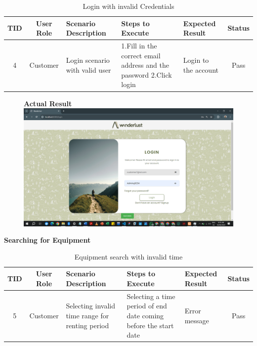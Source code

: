\begin{table}[ht]
\centering
\begin{tabularx}{\textwidth}{|c|c|X|X|X|c|}
\hline
\textbf{TID} & \textbf{User Role} & \textbf{Scenario Description} & \textbf{Steps to Execute} & \textbf{Expected Result} & \textbf{Status} \\ \hline
4 & Customer & Login scenario with valid user & 1.Fill in the correct email address and the password \newline 2.Click login & Login to the account & Pass \\ \hline
\end{tabularx}
\caption{Login with invalid Credentials}
\end{table}

\begin{figure}[h!]
    \centering
    \textbf{Actual Result}
    \includegraphics[width=1\textwidth]{Images/Test Cases/3. valid login.png}
\end{figure}
\clearpage



\textbf{Searching for Equipment}\\
\begin{table}[ht]
\centering
\begin{tabularx}{\textwidth}{|c|c|X|X|X|c|}
\hline
\textbf{TID} & \textbf{User Role} & \textbf{Scenario Description} & \textbf{Steps to Execute} & \textbf{Expected Result} & \textbf{Status} \\ \hline
5 & Customer & Selecting invalid time range for renting period & Selecting a time period of end date coming before the start date & Error message & Pass \\ \hline
\end{tabularx}
\caption{Equipment search with invalid time}
\end{table}

